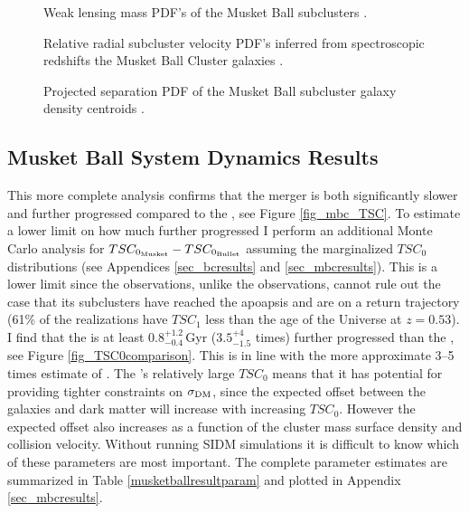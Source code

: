 \documentclass[12pt]{emulateapj}
\begin{document}
\begin{figure}
\caption{Weak lensing mass PDF's of the Musket Ball subclusters \citep{Dawson:2012dl}. 
\label{musket_massinput}}
\end{figure}

\begin{figure}
\caption{Relative radial subcluster velocity PDF's inferred from spectroscopic redshifts the Musket Ball Cluster galaxies  \citep{Dawson:2012dl}. 
\label{musket_vinput}}
\end{figure}

\begin{figure}
\caption{Projected separation PDF of the Musket Ball subcluster galaxy density centroids \citep{Dawson:2012dl}. 
\label{musket_projinput}}
\end{figure}

\subsection{Musket Ball System Dynamics Results}

This more complete analysis confirms that the  merger is both significantly slower and further progressed compared to the , see Figure \ref{fig_mbc_TSC}.
To estimate a lower limit on how much further progressed I perform an additional Monte Carlo analysis  for $TSC_{\rm 0_{Musket}}-TSC_{\rm 0_{Bullet}}$ assuming the marginalized $TSC_0$ distributions (see Appendices \ref{sec_bcresults} and \ref{sec_mbcresults}).
This is a lower limit since the  observations, unlike the  observations, cannot rule out the case that its subclusters have reached the apoapsis and are on a return trajectory (61\% of the realizations have $TSC_1$ less than the age of the Universe at $z=0.53$).
I find that  the  is at least $0.8^{+1.2}_{-0.4}$\,Gyr ($3.5^{+4}_{-1.5}$ times) further progressed than the , see Figure \ref{fig_TSC0comparison}.
This is in line with the more approximate 3--5 times estimate of \citet{Dawson:2012dl}.
The 's relatively large $TSC_0$ means that it has potential for providing tighter constraints on $\sigma_{\rm DM}$, since the expected offset between the galaxies and dark matter will increase with increasing $TSC_0$.
However the expected offset also increases as a function of the cluster mass surface density and collision velocity.
Without running SIDM simulations it is difficult to know which of these parameters are most important.
The complete  parameter estimates are summarized in Table \ref{musketballresultparam} and plotted in Appendix \ref{sec_mbcresults}.
\end{document}
